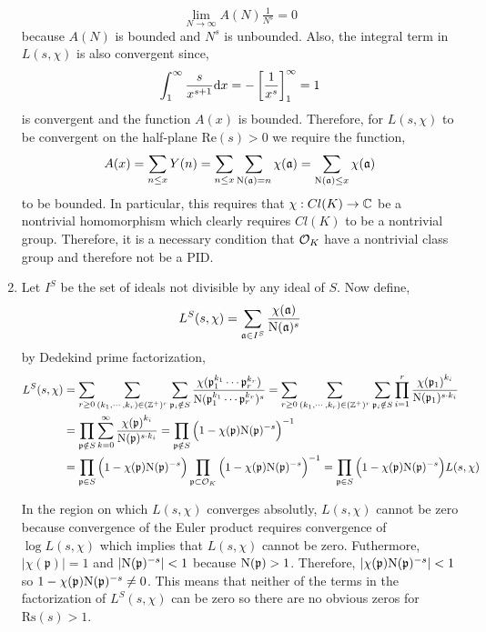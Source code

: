 \documentclass[12pt]{extarticle}
\begin{document}
\begin{enumerate}
\[\lim_{N \to \infty} A(N) \tfrac{1}{N^s} = 0\]
because $A(N)$ is bounded and $N^s$ is unbounded. Also, the integral term in $L(s, \chi)$ is also convergent since,
\[\int_{1}^\infty \frac{s}{x^{s + 1}} \mathrm{d}x = -\left[\frac{1}{x^s}\right]^{\infty}_1 = 1\]
is convergent and the function $A(x)$ is bounded. Therefore, for $L(s, \chi)$ to be convergent on the half-plane $\mathrm{Re}(s) > 0$ we require the function,
\[A(x) = \sum_{n \le x} Y(n) = \sum_{n \le x} \sum_{\mathrm{N}(\mathfrak{a}) = n} \chi(\mathfrak{a}) = \sum_{\mathrm{N}(\mathfrak{a}) \le x} \chi(\mathfrak{a})\]   
to be bounded. In particular, this requires that $\chi : Cl(K) \to \mathbb{C}$ be a nontrivial homomorphism which clearly requires $Cl(K)$ to be a nontrivial group. Therefore, it is a necessary condition that $\mathcal{O}_{K}$ have a nontrivial class group and therefore not be a PID.  

\item Let $I^S$ be the set of ideals not divisible by any ideal of $S$. Now define,
\[L^S(s, \chi) = \sum\limits_{\mathfrak{a} \in I^S} \frac{\chi(\mathfrak{a})}{\mathrm{N}(\mathfrak{a})^s} \]
by Dedekind prime factorization,
\begin{align*}
L^S(s, \chi) & = \sum_{r \ge 0} \sum_{(k_1, \cdots, k_r) \in (\mathbb{Z}^{+})^r}  \sum_{\mathfrak{p}_i \notin S} \frac{\chi{(\mathfrak{p}_1^{k_1} \cdots \mathfrak{p}_r^{k_r}})}{\mathrm{N}( \mathfrak{p}_1^{k_1} \cdots \mathfrak{p}_r^{k_r})^s} = \sum_{r \ge 0} \sum_{(k_1, \cdots, k_r) \in (\mathbb{Z}^{+})^r}  \sum_{\mathfrak{p}_i \notin S} \prod_{i = 1}^{r} \frac{\chi{(\mathfrak{p}_1)}^{k_i}}{\mathrm{N}( \mathfrak{p}_1)^{s \cdot k_i}} \\ 
& = \prod_{\mathfrak{p} \notin S} \sum_{k = 0}^{\infty} \frac{\chi{(\mathfrak{p})}^{k_i}}{\mathrm{N}( \mathfrak{p})^{s \cdot k_i}} = \prod_{\mathfrak{p} \notin S} \Big(1 - \chi(\mathfrak{p}) \mathrm{N}(\mathfrak{p})^{-s} \Big)^{-1} \\ & = \prod_{\mathfrak{p} \in S} \Big(1 - \chi(\mathfrak{p}) \mathrm{N}(\mathfrak{p})^{-s} \Big)  \prod_{\mathfrak{p} \subset \mathcal{O}_{K}} \Big(1 - \chi(\mathfrak{p}) \mathrm{N}(\mathfrak{p})^{-s} \Big)^{-1} = \prod_{\mathfrak{p} \in S} \Big(1 - \chi(\mathfrak{p}) \mathrm{N}(\mathfrak{p})^{-s} \Big) L(s, \chi)
\end{align*}

In the region on which $L(s, \chi)$ converges absolutly, $L(s, \chi)$ cannot be zero because convergence of the Euler product requires convergence of $\log L(s, \chi)$ which implies that $L(s, \chi)$ cannot be zero. Futhermore, $|\chi(\mathfrak{p})| = 1$ and $|\mathrm{N}(\mathfrak{p})^{-s}| < 1$ because $\mathrm{N}(\mathfrak{p}) > 1$. Therefore, $|\chi(\mathfrak{p}) \mathrm{N}(\mathfrak{p})^{-s}| < 1$ so $1 - \chi(\mathfrak{p}) \mathrm{N}(\mathfrak{p})^{-s} \neq 0$. This means that neither of the terms in the factorization of $L^S(s, \chi)$ can be zero so there are no obvious zeros for $\mathrm{Rs}(s) > 1$. 

\end{enumerate}
\end{document}
